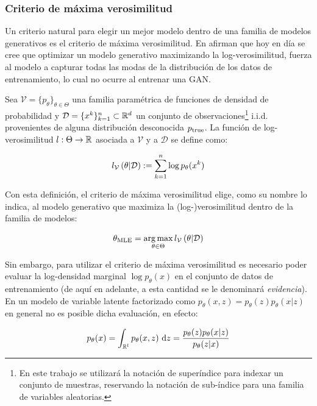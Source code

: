 \subsubsection{Criterio de máxima verosimilitud}

Un criterio natural para elegir un mejor modelo dentro de una familia de modelos generativos es el criterio de máxima verosimilitud. En \cite{nichol2021improved} afirman que hoy en día se cree que optimizar un modelo generativo maximizando la log-verosimilitud, fuerza al modelo a capturar todas las modas de la distribución de los datos de entrenamiento, lo cual no ocurre al entrenar una GAN.

\begin{defn}
    Sea $\mathcal{V}=\{p_\theta\}_{\theta\in\Theta}$ una familia paramétrica de funciones de densidad de probabilidad y $\mathcal{D} = \{x^k\}_{k=1}^n\subset\mathbb{R}^d$ un conjunto de observaciones\footnote{En este trabajo se utilizará la notación de superíndice para indexar un conjunto de muestras, reservando la notación de sub-índice para una familia de variables aleatorias.} i.i.d. provenientes de alguna distribución desconocida $p_{\operatorname{true}}$. La función de log-verosimilitud $l:\Theta\to\mathbb{R}$ asociada a $\mathcal{V}$ y a $\mathcal{D}$ se define como:

    \begin{equation*}
        l_\mathcal{V}\left(\theta|\mathcal{D}\right)
        := \sum_{k=1}^n \log p_\theta(x^k)
    \end{equation*}
\end{defn}

Con esta definición, el criterio de máxima verosimilitud elige, como su nombre lo indica, al modelo generativo que maximiza la (log-)verosimilitud dentro de la familia de modelos:

\begin{equation*}
    \theta_{\text{MLE}}
    =\operatorname*{arg\,max}_{\theta\in\Theta} l_\mathcal{V}\left(\theta|\mathcal{D}\right)
\end{equation*}

Sin embargo, para utilizar el criterio de máxima verosimilitud es necesario poder evaluar la log-densidad marginal $\log p_\theta(x)$ en el conjunto de datos de entrenamiento (de aquí en adelante, a esta cantidad se le denominará \textit{evidencia}). En un modelo de variable latente factorizado como $p_\theta(x,z)=p_\theta(z)p_\theta(x|z)$ en general no es posible dicha evaluación, en efecto:

\begin{equation}
    \label{eq:generative_marginal}
    p_\theta(x)
    = \int_{\mathbb{R}^l} p_\theta(x,z) \,\operatorname{d}\! z
    = \frac{p_\theta(z)p_\theta(x|z)}{p_\theta(z|x)}
\end{equation}

